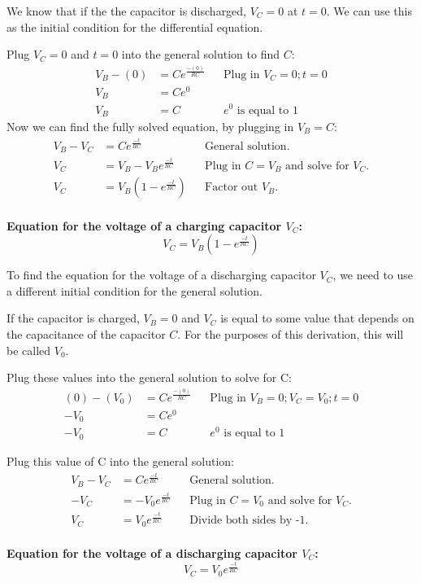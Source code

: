 \documentclass[12pt]{article}
\begin{document}
We know that if the the capacitor is discharged, $V_C = 0$ at $t = 0$. We can use this as the initial condition for the differential equation.

Plug $V_C = 0$ and $t = 0$ into the general solution to find $C$:
\begin{align*}
{V_B - (0)} &= C e^{\frac{-(0)}{RC}} && \text{Plug in } V_C = 0; t = 0 \\
V_B &= C e^{0} && \text{} \\
{V_B} &= C && e^{0} \text{ is equal to 1} 
\end{align*}
Now we can find the fully solved equation, by plugging in $V_B = C$:
\begin{align*}
{V_B - V_C} &= C e^{\frac{-t}{RC}} && \text{General solution.} \\
{V_C} &= V_B - V_B  e^{\frac{-t}{RC}} && \text{Plug in $C = V_B$ and solve for $V_C$.} \\
{V_C} &= V_B(1 - e^{\frac{-t}{RC}}) && \text{Factor out $V_B$.} \\
\end{align*}

\begin{tcolorbox}
\textbf{Equation for the voltage of a charging capacitor $V_C$:}
$$V_C = V_B(1 - e^{\frac{-t}{RC}})$$ 
\end{tcolorbox}

To find the equation for the voltage of a discharging capacitor $V_C$, we need to use a different initial condition for the general solution.

If the capacitor is charged, $V_B = 0$ and $V_C$ is equal to some value that depends on the capacitance of the capacitor $C$. For the purposes of this derivation, this will be called $V_0$.

Plug these values into the general solution to solve for C:
\begin{align*}
{(0) - (V_0)} &= C e^{\frac{-(0)}{RC}} && \text{Plug in } V_B = 0; V_C = V_0; t = 0 \\
-V_0 &= C e^{0} && \text{} \\
{-V_0} &= C && e^{0} \text{ is equal to 1} 
\end{align*}

Plug this value of C into the general solution:
\begin{align*}
{V_B - V_C} &= C e^{\frac{-t}{RC}} && \text{General solution.} \\
{-V_C} &= -V_0 e^{\frac{-t}{RC}} && \text{Plug in $C = V_0$ and solve for $V_C$.} \\
{V_C} &= V_0 e^{\frac{-t}{RC}} && \text{Divide both sides by -1.} \\
\end{align*}
\begin{tcolorbox}
\textbf{Equation for the voltage of a discharging capacitor $V_C$:}
$$V_C = V_0 e^{\frac{-t}{RC}}$$ 
\end{tcolorbox}
\end{document}
